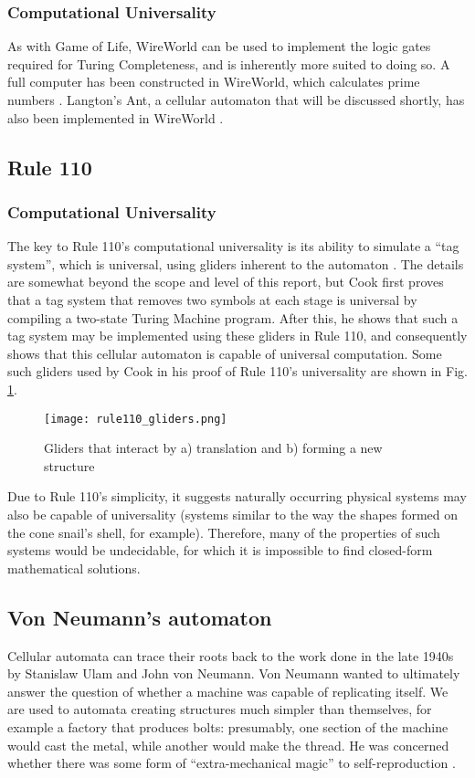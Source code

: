 \documentclass[11pt,a4paper]{article}
\begin{document}
    \subsubsection{Computational Universality}
    As with Game of Life, WireWorld can be used to implement the logic gates
    required for Turing Completeness, and is inherently more suited to doing so.
    A full computer has been constructed in WireWorld, which calculates prime
    numbers \cite{WW_TM}. Langton's Ant, a cellular automaton that will be
    discussed shortly, has also been implemented in WireWorld \cite{WW_LA}.

    \subsection{Rule 110}
    \subsubsection{Computational Universality}
    The key to Rule 110's computational universality is its ability to simulate
    a ``tag system'', which is universal, using gliders inherent to the
    automaton \cite{Rule110_universal}. The details are somewhat beyond the
    scope and level of this report, but Cook first proves that a tag system that
    removes two symbols at each stage is universal by compiling a two-state
    Turing Machine program. After this, he shows that such a tag system may be
    implemented using these gliders in Rule 110, and consequently shows that
    this cellular automaton is capable of universal computation. Some such
    gliders used by Cook in his proof of Rule 110's universality are shown in
    Fig. \ref{fig:110_gliders}.

    \begin{figure}[h]
        \centering
        \texttt{[image: rule110\_gliders.png]}
        \caption{Gliders that interact by a) translation and b) forming a new
        structure}
        \label{fig:110_gliders}
    \end{figure}

    Due to Rule 110's simplicity, it suggests naturally occurring physical
    systems may also be capable of universality (systems similar to the way the
    shapes formed on the cone snail's shell, for example). Therefore, many of
    the properties of such systems would be undecidable, for which it is
    impossible to find closed-form mathematical solutions.

    \subsection{Von Neumann's automaton}
    Cellular automata can trace their roots back to the work done in the late
    1940s by Stanislaw Ulam and John von Neumann. Von Neumann wanted to
    ultimately answer the question of whether a machine was capable of
    replicating itself. We are used to automata creating structures much simpler
    than themselves, for example a factory that produces bolts: presumably, one
    section of the machine would cast the metal, while another would make the
    thread. He was concerned whether there was some form of ``extra-mechanical
    magic'' to self-reproduction \cite{CA_origins}.
\end{document}
